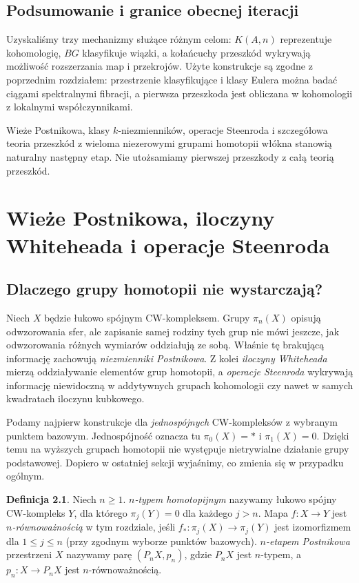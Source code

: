 \documentclass[11pt,a4paper,oneside]{report}
\theoremstyle{plain}
\theoremstyle{definition}
\newtheorem{definicja}[twierdzenie]{Definicja}
\theoremstyle{remark}
\begin{document}
\section{Podsumowanie i granice obecnej iteracji}
Uzyskaliśmy trzy mechanizmy służące różnym celom:
$K(A,n)$ reprezentuje kohomologię,
$BG$ klasyfikuje wiązki, a kołańcuchy przeszkód
wykrywają możliwość rozszerzania map i przekrojów.
Użyte konstrukcje są zgodne z poprzednim rozdziałem:
przestrzenie klasyfikujące i klasy Eulera można badać
ciągami spektralnymi fibracji, a pierwsza przeszkoda
jest obliczana w kohomologii z lokalnymi współczynnikami.

Wieże Postnikowa, klasy $k$-niezmienników,
operacje Steenroda i szczegółowa teoria przeszkód
z wieloma niezerowymi grupami homotopii włókna
stanowią naturalny następny etap. Nie utożsamiamy
pierwszej przeszkody z całą teorią przeszkód.


\chapter{Wieże Postnikowa, iloczyny Whiteheada i operacje Steenroda}
\label{ch:postnikow-v7}

\section{Dlaczego grupy homotopii nie wystarczają?}
Niech $X$ będzie łukowo spójnym CW-kompleksem. Grupy
$\pi_n(X)$ opisują odwzorowania sfer, ale zapisanie samej
rodziny tych grup nie mówi jeszcze, jak odwzorowania
różnych wymiarów oddziałują ze sobą. Właśnie tę brakującą
informację zachowują \emph{niezmienniki Postnikowa}. Z kolei
\emph{iloczyny Whiteheada} mierzą oddziaływanie elementów
grup homotopii, a \emph{operacje Steenroda} wykrywają
informację niewidoczną w addytywnych grupach kohomologii
czy nawet w samych kwadratach iloczynu kubkowego.

Podamy najpierw konstrukcje dla \emph{jednospójnych}
CW-kompleksów z wybranym punktem bazowym. Jednospójność
oznacza tu $\pi_0(X)=*$ i $\pi_1(X)=0$. Dzięki temu
na wyższych grupach homotopii nie występuje nietrywialne
działanie grupy podstawowej. Dopiero w ostatniej sekcji
wyjaśnimy, co zmienia się w przypadku ogólnym.

\begin{definicja}
Niech $n\ge1$. \emph{$n$-typem homotopijnym} nazywamy
łukowo spójny CW-kompleks $Y$, dla którego $\pi_j(Y)=0$
dla każdego $j>n$. Mapa $f:X\to Y$ jest
\emph{$n$-równoważnością} w tym rozdziale, jeśli
$f_*:\pi_j(X)\to\pi_j(Y)$ jest izomorfizmem dla
$1\le j\le n$ (przy zgodnym wyborze punktów bazowych).
\emph{$n$-etapem Postnikowa} przestrzeni $X$ nazywamy
parę $(P_nX,p_n)$, gdzie $P_nX$ jest $n$-typem,
a $p_n:X\to P_nX$ jest $n$-równoważnością.
\end{definicja}
\end{document}
